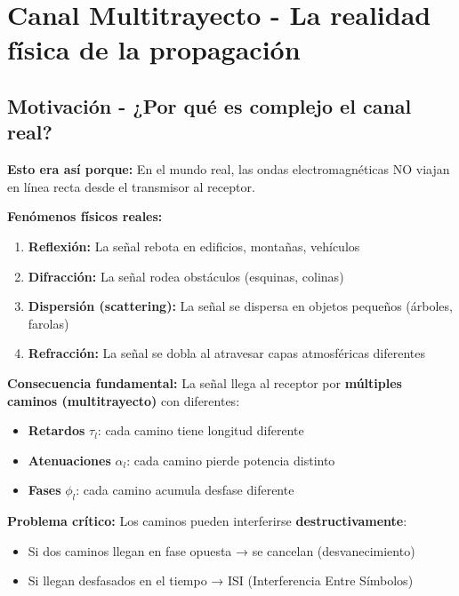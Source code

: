 \documentclass[10pt,a4paper]{article}
\begin{document}
\section{Canal Multitrayecto - La realidad física de la propagación}

\subsection{Motivación - ¿Por qué es complejo el canal real?}

\begin{tcolorbox}[colback=rojoclaro!10,colframe=rojoclaro,title=🧠 FUNDAMENTO FÍSICO]
\textbf{Esto era así porque:} En el mundo real, las ondas electromagnéticas NO viajan en línea recta desde el transmisor al receptor.

\textbf{Fenómenos físicos reales:}
\begin{enumerate}
\item \textbf{Reflexión:} La señal rebota en edificios, montañas, vehículos
\item \textbf{Difracción:} La señal rodea obstáculos (esquinas, colinas)
\item \textbf{Dispersión (scattering):} La señal se dispersa en objetos pequeños (árboles, farolas)
\item \textbf{Refracción:} La señal se dobla al atravesar capas atmosféricas diferentes
\end{enumerate}

\textbf{Consecuencia fundamental:} La señal llega al receptor por \textbf{múltiples caminos (multitrayecto)} con diferentes:
\begin{itemize}
\item \textbf{Retardos} $\tau_l$: cada camino tiene longitud diferente
\item \textbf{Atenuaciones} $\alpha_l$: cada camino pierde potencia distinto
\item \textbf{Fases} $\phi_l$: cada camino acumula desfase diferente
\end{itemize}

\textbf{Problema crítico:} Los caminos pueden interferirse \textbf{destructivamente}:
\begin{itemize}
\item Si dos caminos llegan en fase opuesta → se cancelan (desvanecimiento)
\item Si llegan desfasados en el tiempo → ISI (Interferencia Entre Símbolos)
\end{itemize}
\end{tcolorbox}
\end{document}
